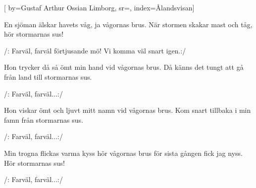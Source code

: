 


[ 	%
	by={Gustaf Arthur Ossian Limborg},	%
	sr={},		%
	index={Ålandsvisan}]		%
	
\beginverse*		%
En sjöman älskar havets våg, 
ja vågornas brus.
När stormen skakar mast och tåg, 
hör stormarnas sus!
\endverse			%

\beginchorus
/: Farväl, farväl förtjusande mö! 
Vi komma väl snart igen.:/
\endchorus

\beginverse*		%
Hon trycker då så ömt min hand 
vid vågornas brus.
Då känns det tungt att gå från land 
till stormarnas sus.
\endverse			%

\beginchorus
/: Farväl, farväl...:/
\endchorus

\beginverse*		%
Hon viskar ömt och ljuvt mitt namn 
vid vågornas brus.
Kom snart tillbaka i min famn 
från stormarnas sus.
\endverse			%

\beginchorus
/: Farväl, farväl...:/
\endchorus

\beginverse*		%
Min trogna flickas varma kyss 
hör vågornas brus 
för sista gången fick jag nyss. 
Hör stormarnas sus!
\endverse			%

\beginchorus
/: Farväl, farväl...:/
\endchorus
\endsong			%
